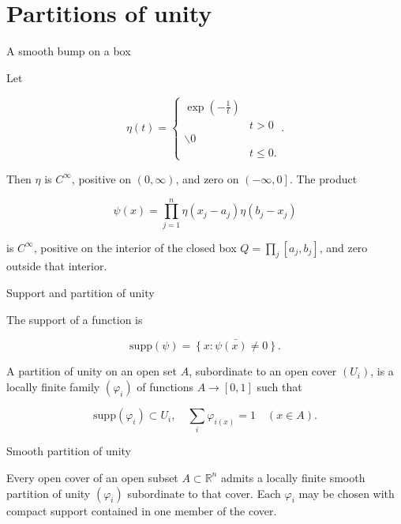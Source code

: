 \section{Partitions of unity}

\begin{definition}{A smooth bump on a box}

Let

\[\eta(t) = \left\{ \begin{matrix}
{\exp\left( {- \frac{1}{t}} \right)} & \\
 & {t > 0} \\
{\backslash 0} & \\
 & {t \leq 0.}
\end{matrix} \right..\]

Then \(\eta\) is \(C^{\infty}\), positive on \(\left( {0,\infty} \right)\), and zero on \(\left( {- \infty,0} \right\rbrack\). The product

\[\psi(x) = \prod\limits_{j = 1}^{n}\eta\left( {x_{j} - a_{j}} \right)\eta\left( {b_{j} - x_{j}} \right)\]

is \(C^{\infty}\), positive on the interior of the closed box \(Q = \prod_{j}\left\lbrack {a_{j},b_{j}} \right\rbrack\), and zero outside that interior.

\end{definition}

\begin{definition}{Support and partition of unity}

The support of a function is

\[\text{supp}(\psi) = \bar{\left\{ {x:\psi(x)\neq 0} \right\}}.\]

A partition of unity on an open set \(A\), subordinate to an open cover \(\left( U_{i} \right)\), is a locally finite family \(\left( \varphi_{i} \right)\) of functions \(A\rightarrow\left\lbrack {0,1} \right\rbrack\) such that

\[\text{supp}\left( \varphi_{i} \right) \subset U_{i},\quad\sum\limits_{i}\varphi_{i{(x)}} = 1\quad\left( {x \in A} \right).\]

\end{definition}

\begin{theorem}{Smooth partition of unity}

Every open cover of an open subset \(A \subset \mathbb{R}^{n}\) admits a locally finite smooth partition of unity \(\left( \varphi_{i} \right)\) subordinate to that cover. Each \(\varphi_{i}\) may be chosen with compact support contained in one member of the cover.

\end{theorem}

